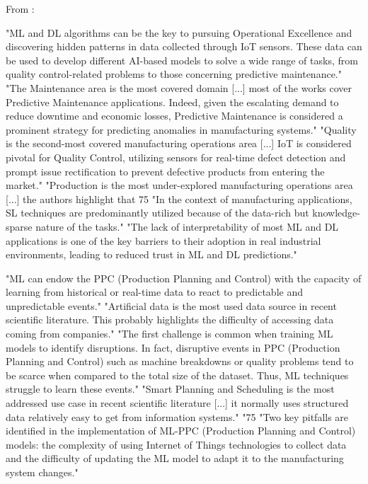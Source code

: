 From \parencite{presciuttini2024ml_iot_manufacturing_operations} :

"ML and DL algorithms can be the key to pursuing Operational Excellence and discovering hidden patterns in data collected through IoT sensors. These data can be used to develop different AI-based models to solve a wide range of tasks, from quality control-related problems to those concerning predictive maintenance."
"The Maintenance area is the most covered domain [...] most of the works cover Predictive Maintenance applications. Indeed, given the escalating demand to reduce downtime and economic losses, Predictive Maintenance is considered a prominent strategy for predicting anomalies in manufacturing systems."
"Quality is the second-most covered manufacturing operations area [...] IoT is considered pivotal for Quality Control, utilizing sensors for real-time defect detection and prompt issue rectification to prevent defective products from entering the market."
"Production is the most under-explored manufacturing operations area [...] the authors highlight that 75%
"In the context of manufacturing applications, SL techniques are predominantly utilized because of the data-rich but knowledge-sparse nature of the tasks."
"The lack of interpretability of most ML and DL applications is one of the key barriers to their adoption in real industrial environments, leading to reduced trust in ML and DL predictions."

"ML can endow the PPC (Production Planning and Control) with the capacity of learning from historical or real-time data to react to predictable and unpredictable events."
"Artificial data is the most used data source in recent scientific literature. This probably highlights the difficulty of accessing data coming from companies."
"The first challenge is common when training ML models to identify disruptions. In fact, disruptive events in PPC (Production Planning and Control) such as machine breakdowns or quality problems tend to be scarce when compared to the total size of the dataset. Thus, ML techniques struggle to learn these events."
"Smart Planning and Scheduling is the most addressed use case in recent scientific literature [...] it normally uses structured data relatively easy to get from information systems."
"75%
"Two key pitfalls are identified in the implementation of ML-PPC (Production Planning and Control) models: the complexity of using Internet of Things technologies to collect data and the difficulty of updating the ML model to adapt it to the manufacturing system changes."

